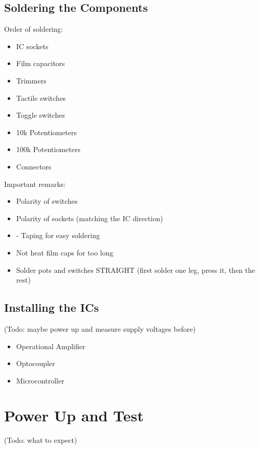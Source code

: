 \documentclass{scrartcl}
\begin{document}
\subsection{Soldering the Components}

Order of soldering:

\begin{itemize}
    \item IC sockets
    \item Film capacitors
    \item Trimmers
    \item Tactile switches
    \item Toggle switches
    \item 10k Potentiometers
    \item 100k Potentiometers
    \item Connectors
\end{itemize}

Important remarks:

\begin{itemize}
    \item Polarity of switches
    \item Polarity of sockets (matching the IC direction)
    \item- Taping for easy soldering
    \item Not heat film caps for too long
    \item Solder pots and switches STRAIGHT
          (first solder one leg, press it, then the rest)
\end{itemize}

\subsection{Installing the ICs}

(Todo: maybe power up and measure supply voltages before)

\begin{itemize}
    \item Operational Amplifier
    \item Optocoupler
    \item Microcontroller
\end{itemize}

\section{Power Up and Test}

 (Todo: what to expect)
\end{document}
